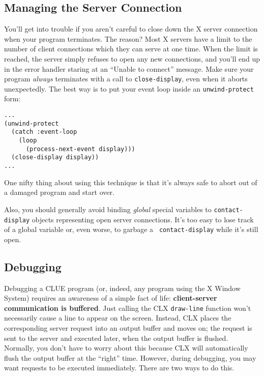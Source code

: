 \subsection*{Managing the Server Connection}
You'll get into trouble if you aren't careful to close down the X server
connection when your program terminates. The reason? Most X servers have a limit
to the number of client connections which they can serve at one time. When the
limit is reached, the server simply refuses to open any new connections, and
you'll end up in the error handler staring at an ``Unable to connect'' message.  Make
sure your program
{\em always} terminates with a call to {\tt close-display},
even when it aborts unexpectedly. The best way is to put your event loop inside
an {\tt unwind-protect} form:

\begin{verbatim}
...
(unwind-protect 
  (catch :event-loop
    (loop
      (process-next-event display)))  
  (close-display display))
...
\end{verbatim}

One nifty thing about using this technique is that it's always safe to
abort out of a damaged program and start over.

Also, you should generally avoid binding {\em global} special variables
to {\tt contact-display} objects representing open server connections. It's too
easy to lose track of a global variable or, even worse, to garbage a {\tt
contact-display} while it's still open.

\subsection*{Debugging}
Debugging a CLUE program (or, indeed, any program using the X Window System)
requires an awareness of a simple fact of life: {\bf client-server communication
is buffered}. Just calling the CLX {\tt draw-line} function won't necessarily
cause a line to appear on the screen. Instead, CLX places the corresponding
server request into an output buffer and moves on; the request is sent to the
server and executed later, when the output buffer is flushed. Normally, you
don't have to worry about this because CLX will automatically flush the output
buffer at the ``right'' time\footnotemark{}. However, during
debugging, you may want requests to be executed immediately. There are
two ways to do this.

